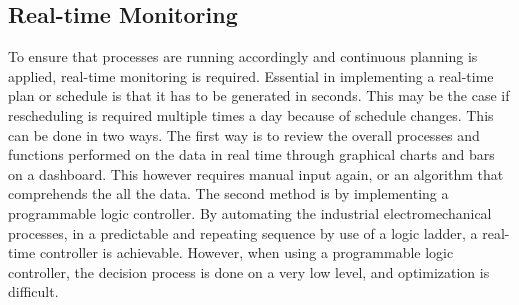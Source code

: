 %




\subsection{Real-time Monitoring}
To ensure that processes are running accordingly and continuous planning is applied, real-time monitoring is required. Essential in implementing a real-time plan or schedule is that it has to be generated in seconds. This may be the case if rescheduling is required multiple times a day because of schedule changes. This can be done in two ways. The first way is to review the overall processes and functions performed on the data in real time through graphical charts and bars on a dashboard. This however requires manual input again, or an algorithm that comprehends the all the data. The second method is by implementing a programmable logic controller. By automating the industrial electromechanical processes, in a predictable and repeating sequence by use of a logic ladder, a real-time controller is achievable. However, when using a programmable logic controller, the decision process is done on a very low level, and optimization is difficult.

